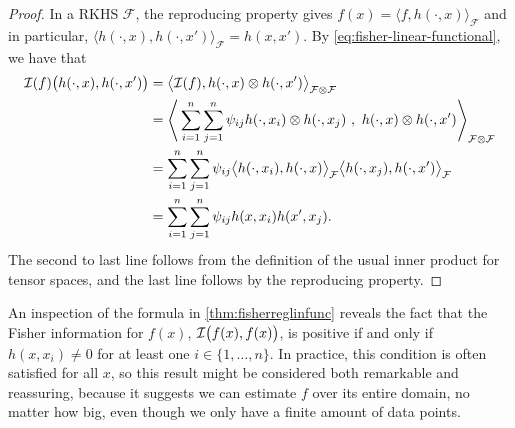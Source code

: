 \begin{proof}
  In a RKHS $\mathcal F$, the reproducing property gives $f(x) = \langle f, h(\cdot, x) \rangle_{\mathcal F}$ and in particular, $\langle h(\cdot,x), h(\cdot, x') \rangle_{\mathcal F} = h(x,x')$. 
  By \cref{eq:fisher-linear-functional}, we have that
  \begin{align*}
    {\mathcal I}(f)\big(h(\cdot,x),h(\cdot,x') \big)
    &= \big\langle {\mathcal I}(f), h(\cdot, x) \otimes h(\cdot, x') \big\rangle_{\mathcal F \otimes \mathcal F} \\
    &= \Bigg\langle \sum_{i=1}^n\sum_{j=1}^n \psi_{ij} h(\cdot,x_i) \otimes h(\cdot,x_j) \ , \ h(\cdot, x) \otimes h(\cdot, x') \Bigg\rangle_{\mathcal F \otimes \mathcal F} \\
    &= \sum_{i=1}^n\sum_{j=1}^n \psi_{ij} \big\langle h(\cdot,x_i), h(\cdot, x) \big\rangle_{\mathcal F} \big\langle h(\cdot,x_j), h(\cdot, x') \big\rangle_{\mathcal F } \\
    &= \sum_{i=1}^n\sum_{j=1}^n \psi_{ij} h(x,x_i) h(x', x_j).
  \end{align*}
  The second to last line follows from the definition of the usual inner product for tensor spaces, and the last line follows by the reproducing property.
\end{proof}

An inspection of the formula in \cref{thm:fisherreglinfunc} reveals the fact that the Fisher information for $f(x)$, ${\mathcal I} \big(f(x),f(x) \big)$, is positive if and only if $h(x,x_i)\neq 0$ for at least one $i \in \{1,\dots,n \}$.
In practice, this condition is often satisfied for all $x$, so this result might be considered both remarkable and reassuring, because it suggests we can estimate $f$ over its entire domain, no matter how big, even though we only have a finite amount of data points.

